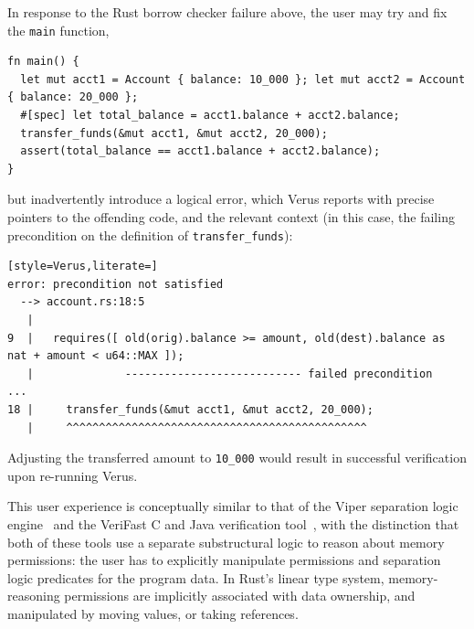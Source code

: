 In response to the Rust borrow checker failure above, the user may try and fix the \verb`main` function,

\begin{lstlisting}[language=Verus,style=VerusLineNos,firstnumber=15]
fn main() {
  let mut acct1 = Account { balance: 10_000 }; let mut acct2 = Account { balance: 20_000 };
  #[spec] let total_balance = acct1.balance + acct2.balance;
  transfer_funds(&mut acct1, &mut acct2, 20_000);
  assert(total_balance == acct1.balance + acct2.balance);
}
\end{lstlisting}

\noindent but inadvertently introduce a logical error, which Verus reports with precise pointers to the
offending code, and the relevant context (in this case, the failing precondition on the definition
of \verb`transfer_funds`):

\begin{lstlisting}[style=Verus,literate=]
error: precondition not satisfied
  --> account.rs:18:5
   |
9  |   requires([ old(orig).balance >= amount, old(dest).balance as nat + amount < u64::MAX ]);
   |              --------------------------- failed precondition
...
18 |     transfer_funds(&mut acct1, &mut acct2, 20_000);
   |     ^^^^^^^^^^^^^^^^^^^^^^^^^^^^^^^^^^^^^^^^^^^^^^
\end{lstlisting}

Adjusting the transferred amount to \verb`10_000` would result in successful verification upon re-running Verus.

This user experience is conceptually similar to that of the Viper separation logic engine~\cite{DBLP:conf/vmcai/0001SS16}
and the VeriFast C and Java verification tool~\cite{VeriFast}, with the distinction that both of these
tools use a separate substructural logic to reason about memory permissions:
the user has to explicitly manipulate permissions and separation logic predicates for the program data.
In Rust's linear type system, memory-reasoning permissions are implicitly associated with data ownership,
and manipulated by moving values, or taking references.

